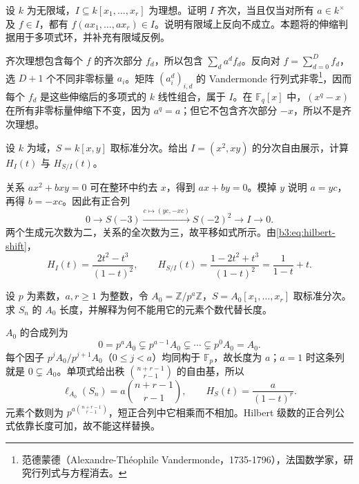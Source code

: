 \begin{exercise}\label{b3:ex:11-homogeneous-scaling}
	设 \(k\) 为无限域，\(I\subseteq k[x_1,\ldots,x_r]\) 为理想。证明 \(I\) 齐次，当且仅当对所有 \(a\in k^\times\) 及 \(f\in I\)，都有 \(f(ax_1,\ldots,ax_r)\in I\)。说明有限域上反向不成立。本题将\cite[\S13, Exercise 13.1, p. 102]{Matsumura1989CommutativeRingTheory}的伸缩判据用于多项式环，并补充有限域反例。
\end{exercise}
\begin{solution}
	齐次理想包含每个 \(f\) 的齐次部分 \(f_d\)，所以包含 \(\sum_d a^df_d\)。反向对 \(f=\sum_{d=0}^D f_d\)，选 \(D+1\) 个不同非零标量 \(a_i\)。矩阵 \((a_i^d)_{i,d}\) 的 Vandermonde 行列式非零\footnote{范德蒙德（Alexandre-Théophile Vandermonde，1735-1796），法国数学家，研究行列式与方程消去。}，因而每个 \(f_d\) 是这些伸缩后的多项式的 \(k\) 线性组合，属于 \(I\)。在 \(\mathbb F_q[x]\) 中，\((x^q-x)\) 在所有非零标量伸缩下不变，因为 \(a^q=a\)；但它不包含齐次部分 \(-x\)，所以不是齐次理想。
\end{solution}

\begin{exercise}\label{b3:ex:11-graded-ideal-presentation}
	设 \(k\) 为域，\(S=k[x,y]\) 取标准分次。给出 \(I=(x^2,xy)\) 的分次自由展示，计算 \(H_I(t)\) 与 \(H_{S/I}(t)\)。
\end{exercise}
\begin{solution}
	关系 \(ax^2+bxy=0\) 可在整环中约去 \(x\)，得到 \(ax+by=0\)。模掉 \(y\) 说明 \(a=yc\)，再得 \(b=-xc\)。因此有正合列
	\[
		0\to S(-3)\xrightarrow{c\mapsto(yc,-xc)}S(-2)^2\to I\to0.
	\]
	两个生成元次数为二，关系的全次数为三，故平移如式所示。由\eqref{b3:eq:hilbert-shift}，
	\[
		H_I(t)=\dfrac{2t^2-t^3}{(1-t)^2},\qquad H_{S/I}(t)=\dfrac{1-2t^2+t^3}{(1-t)^2}=\dfrac1{1-t}+t.
	\]
\end{solution}

\begin{exercise}\label{b3:ex:11-length-not-cardinality}
	设 \(p\) 为素数，\(a,r\ge1\) 为整数，令 \(A_0=\mathbb Z/p^a\mathbb Z\)，\(S=A_0[x_1,\ldots,x_r]\) 取标准分次。求 \(S_n\) 的 \(A_0\) 长度，并解释为何不能用它的元素个数代替长度。
\end{exercise}
\begin{solution}
	\(A_0\) 的合成列为
	\[
		0=p^aA_0\subsetneq p^{a-1}A_0\subsetneq\cdots\subsetneq p^0A_0=A_0.
	\]
	每个因子 \(p^jA_0/p^{j+1}A_0\)（\(0\le j<a\)）均同构于 \(\mathbb F_p\)，故长度为 \(a\)；\(a=1\) 时这条列就是 \(0\subsetneq A_0\)。单项式给出秩 \(\binom{n+r-1}{r-1}\) 的自由基，所以
	\[
		\ell_{A_0}(S_n)=a\binom{n+r-1}{r-1},\qquad H_S(t)=\dfrac a{(1-t)^r}.
	\]
	元素个数则为 \(p^{a\binom{n+r-1}{r-1}}\)，短正合列中它相乘而不相加。Hilbert 级数的正合列公式依靠长度可加，故不能这样替换。
\end{solution}

